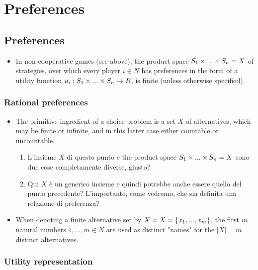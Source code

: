 \chapter{Preferences}
\section{Preferences}
\begin{itemize}
	\item In non-cooperative games (see above), the product space $S_1 \times ... \times S_n = X$ of strategies, over which every player $i \in N$ has preferences in the form of a utility function $u_i:S_1 \times ... \times S_n \to R$, is finite (unless otherwise specified).
\end{itemize}

\subsection{Rational preferences}
\begin{itemize}
	\item The primitive ingredient of a choice problem is a set $X$ of alternatives, which may be finite or infinite, and in this latter case either countable or uncountable.
			\begin{enumerate}
				\item L'insieme $X$ di questo punto e the product space $S_1 \times ... \times S_n = X$ sono due cose completamente diverse, giusto?
				\item Qui $X$ \`e un generico insieme e quindi potrebbe anche essere quello del punto precedente? L'importante, come vedremo, che sia definita una relazione di preferenza?
			\end{enumerate}
		
	\item When denoting a finite alternative set by $X = X = \{x_1, ..., x_m\}$, the first $m$ natural numbers $1, ..., m \in N$ are used as distinct "names" for the $|X|=m$ distinct alternatives.
\end{itemize}

\subsection{Utility representation}